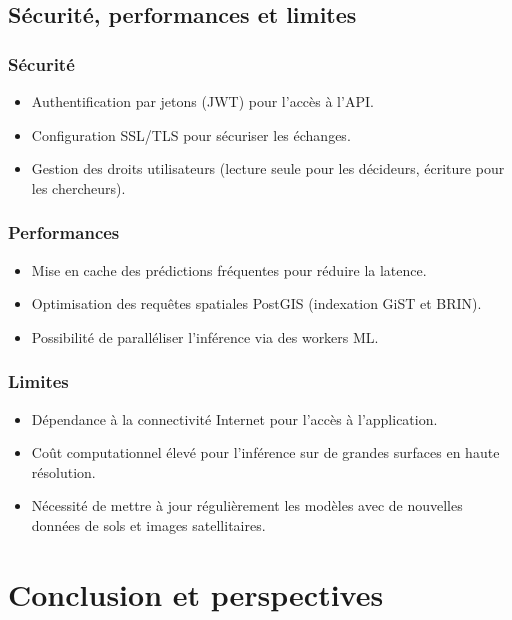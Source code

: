 \documentclass[12pt,a4paper,oneside]{report}
\begin{document}
\section{Sécurité, performances et limites}
\subsection*{Sécurité}
\begin{itemize}
  \item Authentification par jetons (JWT) pour l’accès à l’API.
  \item Configuration SSL/TLS pour sécuriser les échanges.
  \item Gestion des droits utilisateurs (lecture seule pour les décideurs, écriture pour les chercheurs).
\end{itemize}

\subsection*{Performances}
\begin{itemize}
  \item Mise en cache des prédictions fréquentes pour réduire la latence.
  \item Optimisation des requêtes spatiales PostGIS (indexation GiST et BRIN).
  \item Possibilité de paralléliser l’inférence via des workers ML.
\end{itemize}

\subsection*{Limites}
\begin{itemize}
  \item Dépendance à la connectivité Internet pour l’accès à l’application.
  \item Coût computationnel élevé pour l’inférence sur de grandes surfaces en haute résolution.
  \item Nécessité de mettre à jour régulièrement les modèles avec de nouvelles données de sols et images satellitaires.
\end{itemize}



\chapter{Conclusion et perspectives}
\end{document}
